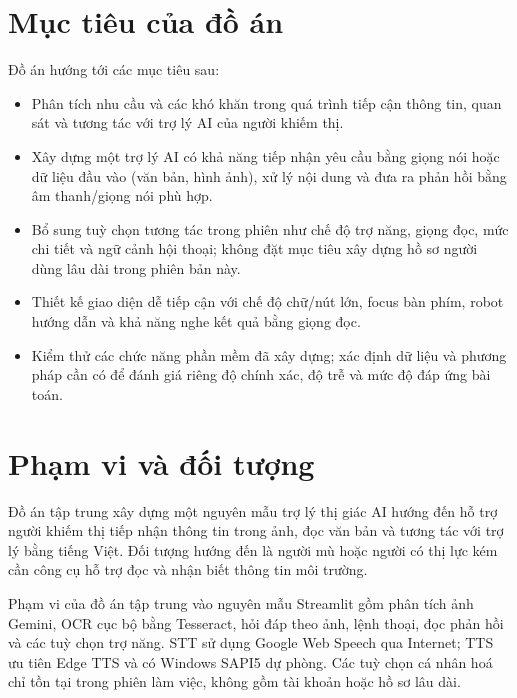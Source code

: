 \section{Mục tiêu của đồ án}

Đồ án hướng tới các mục tiêu sau:
\begin{itemize}[leftmargin=1.6em, itemsep=2pt]
  \item Phân tích nhu cầu và các khó khăn trong quá trình tiếp cận thông tin,
        quan sát và tương tác với trợ lý AI của người khiếm thị.
        
  \item Xây dựng một trợ lý AI có khả năng tiếp nhận yêu cầu bằng giọng nói
        hoặc dữ liệu đầu vào (văn bản, hình ảnh), xử lý nội dung và đưa ra
        phản hồi bằng âm thanh/giọng nói phù hợp.
        
  \item Bổ sung tuỳ chọn tương tác trong phiên như chế độ trợ năng, giọng đọc,
        mức chi tiết và ngữ cảnh hội thoại; không đặt mục tiêu xây dựng hồ sơ
        người dùng lâu dài trong phiên bản này.
        
  \item Thiết kế giao diện dễ tiếp cận với chế độ chữ/nút lớn, focus bàn phím,
        robot hướng dẫn và khả năng nghe kết quả bằng giọng đọc.
        
  \item Kiểm thử các chức năng phần mềm đã xây dựng; xác định dữ liệu và phương pháp
        cần có để đánh giá riêng độ chính xác, độ trễ và mức độ đáp ứng bài toán.
\end{itemize}

\section{Phạm vi và đối tượng}

Đồ án tập trung xây dựng một nguyên mẫu trợ lý thị giác AI hướng đến hỗ trợ
người khiếm thị tiếp nhận thông tin trong ảnh, đọc văn bản và tương tác với
trợ lý bằng tiếng Việt. Đối tượng hướng đến là người mù hoặc người có thị lực
kém cần công cụ hỗ trợ đọc và nhận biết thông tin môi trường.

Phạm vi của đồ án tập trung vào nguyên mẫu Streamlit gồm phân tích ảnh Gemini,
OCR cục bộ bằng Tesseract, hỏi đáp theo ảnh, lệnh thoại, đọc phản hồi và các
tuỳ chọn trợ năng. STT sử dụng Google Web Speech qua Internet; TTS ưu tiên
Edge TTS và có Windows SAPI5 dự phòng. Các tuỳ chọn cá nhân hoá chỉ tồn tại
trong phiên làm việc, không gồm tài khoản hoặc hồ sơ lâu dài.

